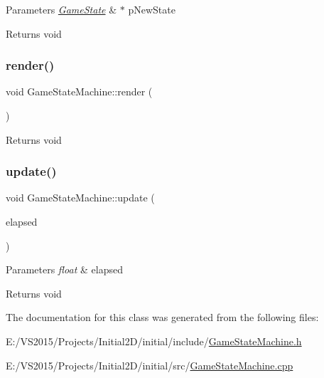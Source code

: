 \begin{DoxyParams}{Parameters}
{\em \mbox{\hyperlink{class_game_state}{Game\+State}}} & $\ast$ p\+New\+State \\
\hline
\end{DoxyParams}
\begin{DoxyReturn}{Returns}
void 
\end{DoxyReturn}
\mbox{\label{class_game_state_machine_abfad06d5c6aa2f7d96a18e405f6d56c5}} 
\subsubsection{\texorpdfstring{render()}{render()}}
{\footnotesize\ttfamily void Game\+State\+Machine\+::render (\begin{DoxyParamCaption}{ }\end{DoxyParamCaption})}

\begin{DoxyReturn}{Returns}
void 
\end{DoxyReturn}
\mbox{\label{class_game_state_machine_ada04eb6547853c56262fc9f8b8cd7a04}} 
\subsubsection{\texorpdfstring{update()}{update()}}
{\footnotesize\ttfamily void Game\+State\+Machine\+::update (\begin{DoxyParamCaption}\item[{float}]{elapsed }\end{DoxyParamCaption})}


\begin{DoxyParams}{Parameters}
{\em float} & elapsed \\
\hline
\end{DoxyParams}
\begin{DoxyReturn}{Returns}
void 
\end{DoxyReturn}


The documentation for this class was generated from the following files\+:\begin{DoxyCompactItemize}
\item 
E\+:/\+V\+S2015/\+Projects/\+Initial2\+D/initial/include/\mbox{\hyperlink{_game_state_machine_8h}{Game\+State\+Machine.\+h}}\item 
E\+:/\+V\+S2015/\+Projects/\+Initial2\+D/initial/src/\mbox{\hyperlink{_game_state_machine_8cpp}{Game\+State\+Machine.\+cpp}}\end{DoxyCompactItemize}
